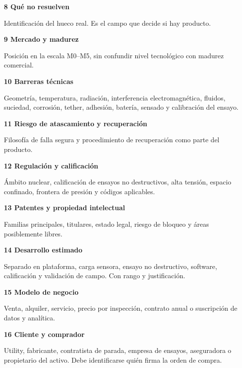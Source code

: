 \documentclass[11pt,a4paper]{article}
\newenvironment{tarjeta}[2]
  {\begin{tarjetabase}%
   {\sffamily\bfseries\color{navy}#1}%
   \ifstrempty{#2}{}{\\[1pt]{\sffamily\scriptsize\color{gray2}#2}}%
   \par\vspace{3pt}}
  {\end{tarjetabase}}
\begin{document}
\begin{tarjeta}{8 \textperiodcentered{} Qué no resuelven}{}
Identificación del hueco real. Es el campo que decide si hay producto.

\end{tarjeta}
\begin{tarjeta}{9 \textperiodcentered{} Mercado y madurez}{}
Posición en la escala M0–M5, sin confundir nivel tecnológico con madurez comercial.

\end{tarjeta}
\begin{tarjeta}{10 \textperiodcentered{} Barreras técnicas}{}
Geometría, temperatura, radiación, interferencia electromagnética, fluidos, suciedad, corrosión, tether, adhesión, batería, sensado y calibración del ensayo.

\end{tarjeta}
\begin{tarjeta}{11 \textperiodcentered{} Riesgo de atascamiento y recuperación}{}
Filosofía de falla segura y procedimiento de recuperación como parte del producto.

\end{tarjeta}
\begin{tarjeta}{12 \textperiodcentered{} Regulación y calificación}{}
Ámbito nuclear, calificación de ensayos no destructivos, alta tensión, espacio confinado, frontera de presión y códigos aplicables.

\end{tarjeta}
\begin{tarjeta}{13 \textperiodcentered{} Patentes y propiedad intelectual}{}
Familias principales, titulares, estado legal, riesgo de bloqueo y áreas posiblemente libres.

\end{tarjeta}
\begin{tarjeta}{14 \textperiodcentered{} Desarrollo estimado}{}
Separado en plataforma, carga sensora, ensayo no destructivo, software, calificación y validación de campo. Con rango y justificación.

\end{tarjeta}
\begin{tarjeta}{15 \textperiodcentered{} Modelo de negocio}{}
Venta, alquiler, servicio, precio por inspección, contrato anual o suscripción de datos y analítica.

\end{tarjeta}
\begin{tarjeta}{16 \textperiodcentered{} Cliente y comprador}{}
Utility, fabricante, contratista de parada, empresa de ensayos, aseguradora o propietario del activo. Debe identificarse quién firma la orden de compra.

\end{tarjeta}
\end{document}

